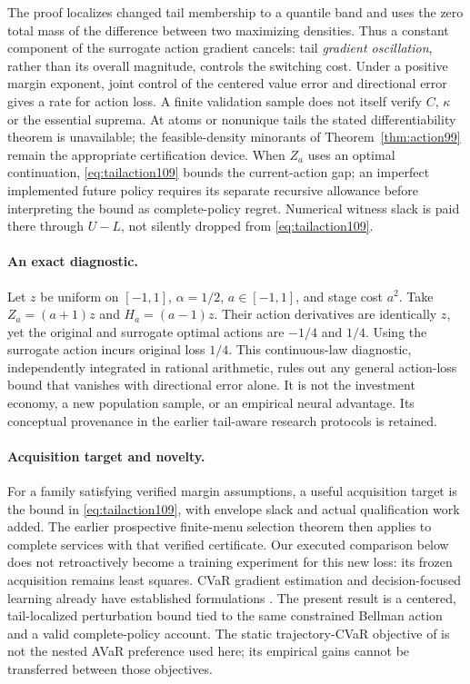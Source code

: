 The proof localizes changed tail membership to a quantile band and uses the zero total mass of the difference between two maximizing densities. Thus a constant component of the surrogate action gradient cancels: tail \emph{gradient oscillation}, rather than its overall magnitude, controls the switching cost. Under a positive margin exponent, joint control of the centered value error and directional error gives a rate for action loss. A finite validation sample does not itself verify $C$, $\kappa$ or the essential suprema. At atoms or nonunique tails the stated differentiability theorem is unavailable; the feasible-density minorants of Theorem~\ref{thm:action99} remain the appropriate certification device. When $Z_a$ uses an optimal continuation, \eqref{eq:tailaction109} bounds the current-action gap; an imperfect implemented future policy requires its separate recursive allowance before interpreting the bound as complete-policy regret. Numerical witness slack is paid there through $U-L$, not silently dropped from \eqref{eq:tailaction109}.

\paragraph{An exact diagnostic.}
Let $z$ be uniform on $[-1,1]$, $\alpha=1/2$, $a\in[-1,1]$, and stage cost $a^2$. Take $Z_a=(a+1)z$ and $H_a=(a-1)z$. Their action derivatives are identically $z$, yet the original and surrogate optimal actions are $-1/4$ and $1/4$. Using the surrogate action incurs original loss $1/4$. This continuous-law diagnostic, independently integrated in rational arithmetic, rules out any general action-loss bound that vanishes with directional error alone. It is not the investment economy, a new population sample, or an empirical neural advantage. Its conceptual provenance in the earlier tail-aware research protocols is retained.

\paragraph{Acquisition target and novelty.}
For a family satisfying verified margin assumptions, a useful acquisition target is the bound in \eqref{eq:tailaction109}, with envelope slack and actual qualification work added. The earlier prospective finite-menu selection theorem then applies to complete services with that verified certificate. Our executed comparison below does not retroactively become a training experiment for this new loss: its frozen acquisition remains least squares. CVaR gradient estimation and decision-focused learning already have established formulations \citep{Tamar2015,LuoDelage2026,ElmachtoubGrigas2022}. The present result is a centered, tail-localized perturbation bound tied to the same constrained Bellman action and a valid complete-policy account. The static trajectory-CVaR objective of \citet{LuoDelage2026} is not the nested AVaR preference used here; its empirical gains cannot be transferred between those objectives.
